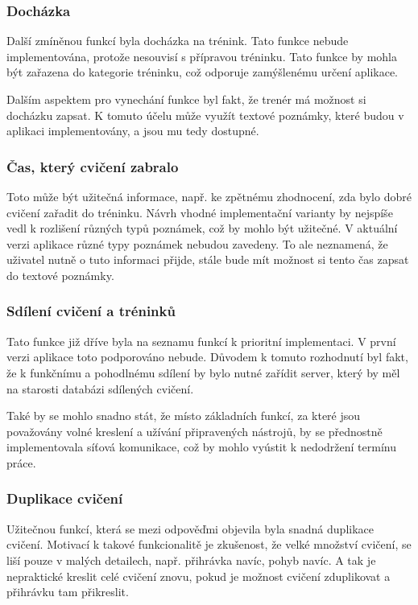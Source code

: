 \documentclass[thesis=B,czech]{FITthesis}[2012/06/26]
\begin{document}
\subsubsection{Docházka}

	Další zmíněnou funkcí byla docházka na trénink. Tato funkce nebude implementována, protože nesouvisí s přípravou tréninku. Tato funkce by mohla být zařazena do kategorie  tréninku, což odporuje zamýšlenému určení aplikace.

	Dalším aspektem pro vynechání funkce byl fakt, že trenér má možnost si docházku zapsat. K tomuto účelu může využít textové poznámky, které budou v aplikaci implementovány, a jsou mu tedy dostupné.

\subsubsection{Čas, který cvičení zabralo}

	Toto může být užitečná informace, např. ke zpětnému zhodnocení, zda bylo dobré cvičení zařadit do tréninku. Návrh vhodné implementační varianty by nejspíše vedl k rozlišení různých typů poznámek, což by mohlo být užitečné. V aktuální verzi aplikace různé typy poznámek nebudou zavedeny. To ale neznamená, že uživatel nutně o tuto informaci přijde, stále bude mít možnost si tento čas zapsat do textové poznámky.

\subsubsection{Sdílení cvičení a tréninků}

	Tato funkce již dříve byla na seznamu funkcí k prioritní implementaci. V první verzi aplikace toto podporováno nebude. Důvodem k tomuto rozhodnutí byl fakt, že k funkčnímu a pohodlnému sdílení by bylo nutné zařídit server, který by měl na starosti databázi sdílených cvičení.

	Také by se mohlo snadno stát, že místo základních funkcí, za které jsou považovány volné kreslení a užívání připravených nástrojů, by se přednostně implementovala síťová komunikace, což by mohlo vyústit k nedodržení termínu práce.

\subsubsection{Duplikace cvičení}

	Užitečnou funkcí, která se mezi odpověďmi objevila byla snadná duplikace cvičení. Motivací k takové funkcionalitě je zkušenost, že velké množství cvičení, se liší pouze v malých detailech, např. přihrávka navíc, pohyb navíc. A tak je nepraktické kreslit celé cvičení znovu, pokud je možnost cvičení zduplikovat a přihrávku tam přikreslit.
\end{document}

